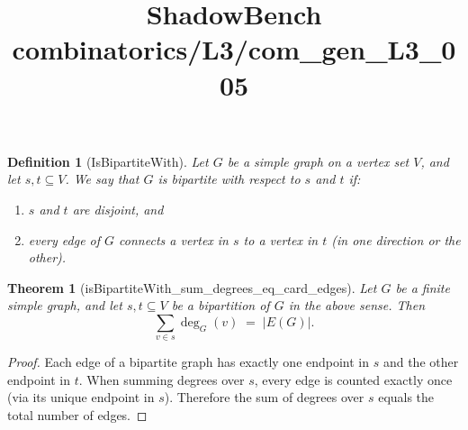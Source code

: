 \documentclass{article}
\title{ShadowBench combinatorics/L3/com\_gen\_L3\_005}
\newtheorem{theorem}{Theorem}
\newtheorem{definition}{Definition}
\begin{document}
\maketitle

\begin{definition}[IsBipartiteWith]
Let \(G\) be a simple graph on a vertex set \(V\), and let \(s,t \subseteq V\).
We say that \(G\) is \emph{bipartite with respect to \(s\) and \(t\)} if:
\begin{enumerate}
\item \(s\) and \(t\) are disjoint, and
\item every edge of \(G\) connects a vertex in \(s\) to a vertex in \(t\)
      (in one direction or the other).
\end{enumerate}
\end{definition}

\begin{theorem}[isBipartiteWith_sum_degrees_eq_card_edges]
Let \(G\) be a finite simple graph, and let \(s,t \subseteq V\) be a bipartition of \(G\)
in the above sense. Then
\[
\sum_{v \in s} \deg_G(v) \;=\; |E(G)|.
\]
\end{theorem}

\begin{proof}
Each edge of a bipartite graph has exactly one endpoint in \(s\) and the other endpoint in \(t\).
When summing degrees over \(s\), every edge is counted exactly once (via its unique endpoint in \(s\)).
Therefore the sum of degrees over \(s\) equals the total number of edges.
\end{proof}
\end{document}
